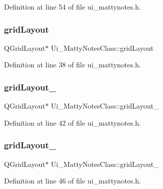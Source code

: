 Definition at line 54 of file ui\+\_\+mattynotes.\+h.

\hypertarget{classUi__MattyNotesClass_a854a660e1e7abdbd4548aa4b39969196}{}\label{classUi__MattyNotesClass_a854a660e1e7abdbd4548aa4b39969196} 
\subsubsection{\texorpdfstring{grid\+Layout}{gridLayout}}
{\footnotesize\ttfamily Q\+Grid\+Layout$\ast$ Ui\+\_\+\+Matty\+Notes\+Class\+::grid\+Layout}



Definition at line 38 of file ui\+\_\+mattynotes.\+h.

\hypertarget{classUi__MattyNotesClass_a568e0fe1cd6a4711a9e881b8855ad15a}{}\label{classUi__MattyNotesClass_a568e0fe1cd6a4711a9e881b8855ad15a} 
\subsubsection{\texorpdfstring{grid\+Layout\+\_}{gridLayout\_2}}
{\footnotesize\ttfamily Q\+Grid\+Layout$\ast$ Ui\+\_\+\+Matty\+Notes\+Class\+::grid\+Layout\+\_}



Definition at line 42 of file ui\+\_\+mattynotes.\+h.

\hypertarget{classUi__MattyNotesClass_a3fb284446d42efd061111a37e6806637}{}\label{classUi__MattyNotesClass_a3fb284446d42efd061111a37e6806637} 
\subsubsection{\texorpdfstring{grid\+Layout\+\_}{gridLayout\_3}}
{\footnotesize\ttfamily Q\+Grid\+Layout$\ast$ Ui\+\_\+\+Matty\+Notes\+Class\+::grid\+Layout\+\_}



Definition at line 46 of file ui\+\_\+mattynotes.\+h.

